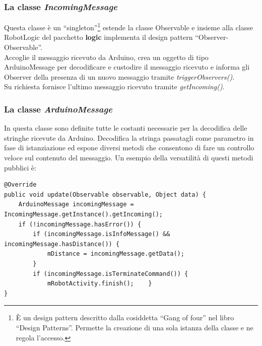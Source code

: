 \subsubsection{La classe \emph{IncomingMessage}}
Questa classe è un ``singleton''\footnote{È un design pattern descritto dalla 
cosiddetta ``Gang of four'' nel libro ``Design Patterns''. 
Permette la creazione di una sola istanza della classe e ne regola l'accesso. } 
estende la classe Observable e insieme alla classe RobotLogic del 
pacchetto \textbf{logic} implementa il design pattern ``Observer-Observable''. 
\\Accoglie il messaggio ricevuto da Arduino, crea un oggetto di tipo ArduinoMessage 
per decodificare e custodire il messaggio ricevuto e informa gli Observer della presenza 
di un nuovo messaggio tramite \emph{triggerObservers()}.\\
Su richiesta fornisce l'ultimo messaggio ricevuto tramite \emph{getIncoming()}.

\subsubsection{La classe \emph{ArduinoMessage}}
In questa classe sono definite tutte le costanti necessarie per la 
decodifica delle stringhe ricevute da Arduino. 
Decodifica la stringa passatagli come parametro in fase di istanziazione ed 
espone diversi metodi che consentono di fare un controllo veloce sul contenuto del messaggio.
Un esempio della versatilità di questi metodi pubblici è:  
\lstset{language=Java}

\begin{lstlisting}[caption=Metodo \emph{update()} di RobotLogic del 
pacchetto \textbf{logic}]
@Override
public void update(Observable observable, Object data) {
    ArduinoMessage incomingMessage = IncomingMessage.getInstance().getIncoming();
    if (!incomingMessage.hasError()) {
        if (incomingMessage.isInfoMessage() && incomingMessage.hasDistance()) {
            mDistance = incomingMessage.getData();
        }
        if (incomingMessage.isTerminateCommand()) {
            mRobotActivity.finish();    }
}
\end{lstlisting}

